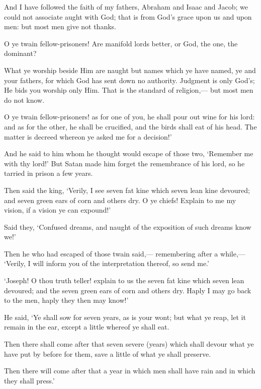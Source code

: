 \documentclass[fontsize=14pt, letterpaper, notitlepage, openany, DIV=12]{scrbook} %
\begin{document}
\noindent[12:38]
And I have followed the faith of my fathers, Abraham and Isaac and Jacob; we could not
associate aught with God; that is from God's grace upon us and upon men: but most men give
not thanks.

\noindent[12:39]
O ye twain fellow-prisoners! Are manifold lords better, or God, the one, the dominant?

\noindent[12:40]
What ye worship beside Him are naught but names which ye have named, ye and your
fathers, for which God has sent down no authority. Judgment is only God's; He bids you worship
only Him. That is the standard of religion,--- but most men do not know.

\noindent[12:41]
O ye twain fellow-prisoners! as for one of you, he shall pour out wine for his lord: and as
for the other, he shall be crucified, and the birds shall eat of his head. The matter is decreed
whereon ye asked me for a decision!'

\noindent[12:42]
And he said to him whom he thought would escape of those two, `Remember me with thy
lord!' But Satan made him forget the remembrance of his lord, so he tarried in prison a few
years.

\noindent[12:43]
Then said the king, `Verily, I see seven fat kine which seven lean kine devoured; and
seven green ears of corn and others dry. O ye chiefs! Explain to me my vision, if a vision ye can
expound!'

\noindent[12:44]
Said they, `Confused dreams, and naught of the exposition of such dreams know we!'

\noindent[12:45]
Then he who had escaped of those twain said,--- remembering after a while,--- `Verily, I
will inform you of the interpretation thereof, so send me.'

\noindent[12:46]
`Joseph! O thou truth teller! explain to us the seven fat kine which seven lean devoured;
and the seven green ears of corn and others dry. Haply I may go back to the men, haply they then
may know!'

\noindent[12:47]
He said, `Ye shall sow for seven years, as is your wont; but what ye reap, let it remain in
the ear, except a little whereof ye shall eat.

\noindent[12:48]
Then there shall come after that seven severe (years) which shall devour what ye have put
by before for them, save a little of what ye shall preserve.

\noindent[12:49]
Then there will come after that a year in which men shall have rain and in which they
shall press.'
\end{document}

